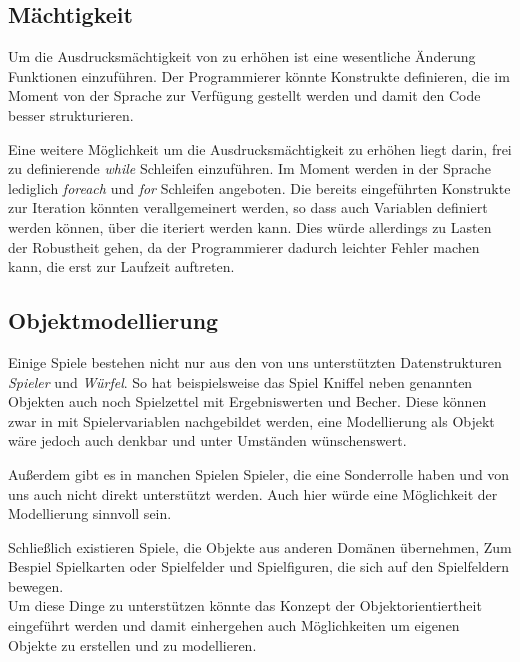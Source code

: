 \subsection{Mächtigkeit} %
\label{sub:machtigkeit}
Um die Ausdrucksmächtigkeit von \dg zu erhöhen ist eine wesentliche Änderung Funktionen einzuführen. Der Programmierer könnte Konstrukte definieren, die im Moment von der Sprache zur Verfügung gestellt werden und damit den Code besser strukturieren. 

Eine weitere Möglichkeit um die Ausdrucksmächtigkeit zu erhöhen liegt darin, frei zu definierende \emph{while} Schleifen einzuführen. Im Moment werden in der Sprache lediglich \emph{foreach} und \emph{for} Schleifen angeboten. Die bereits eingeführten Konstrukte zur Iteration könnten verallgemeinert werden, so dass auch Variablen definiert werden können, über die iteriert werden kann. Dies würde allerdings zu Lasten der Robustheit gehen, da der Programmierer dadurch leichter Fehler machen kann, die erst zur Laufzeit auftreten.

\subsection{Objektmodellierung} %
\label{sub:objektmodellierung}
Einige Spiele bestehen nicht nur aus den von uns unterstützten Datenstrukturen \emph{Spieler} und \emph{Würfel}. So hat beispielsweise das Spiel Kniffel neben genannten Objekten auch noch Spielzettel mit Ergebniswerten und Becher. Diese können zwar in \dg mit Spielervariablen nachgebildet werden, eine Modellierung als Objekt wäre jedoch auch denkbar und unter Umständen wünschenswert.

Außerdem gibt es in manchen Spielen Spieler, die eine Sonderrolle haben und von uns auch nicht direkt unterstützt werden. Auch hier würde eine Möglichkeit der Modellierung sinnvoll sein.

Schließlich existieren Spiele, die Objekte aus anderen Domänen übernehmen, Zum Bespiel Spielkarten oder Spielfelder und Spielfiguren, die sich auf den Spielfeldern bewegen.\\

Um diese Dinge zu unterstützen könnte das Konzept der Objektorientiertheit eingeführt werden und damit einhergehen auch Möglichkeiten um eigenen Objekte zu erstellen und zu modellieren.


